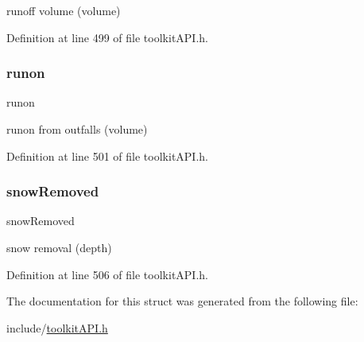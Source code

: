 runoff volume (volume) 

Definition at line 499 of file toolkit\+A\+P\+I.\+h.

\mbox{\label{struct_s_m___runoff_totals_ac05f157303936535978c7e69f6dfb16f}} 
\subsubsection{\texorpdfstring{runon}{runon}}
{\footnotesize\ttfamily runon}

runon from outfalls (volume) 

Definition at line 501 of file toolkit\+A\+P\+I.\+h.

\mbox{\label{struct_s_m___runoff_totals_ad3b23dfe7238169f9f3a0530fba2ba39}} 
\subsubsection{\texorpdfstring{snow\+Removed}{snowRemoved}}
{\footnotesize\ttfamily snow\+Removed}

snow removal (depth) 

Definition at line 506 of file toolkit\+A\+P\+I.\+h.



The documentation for this struct was generated from the following file\+:\begin{DoxyCompactItemize}
\item 
include/\hyperlink{toolkit_a_p_i_8h}{toolkit\+A\+P\+I.\+h}\end{DoxyCompactItemize}
